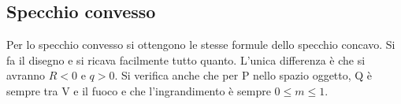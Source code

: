 \subsection{Specchio convesso}
Per lo specchio convesso si ottengono le stesse formule dello specchio concavo. Si fa il disegno e si ricava facilmente tutto quanto. L'unica differenza è che si avranno \(R<0\) e \(q>0\). Si verifica anche che per P nello spazio oggetto, Q è sempre tra V e il fuoco e che l'ingrandimento è sempre \(0 \leq m \leq 1\).